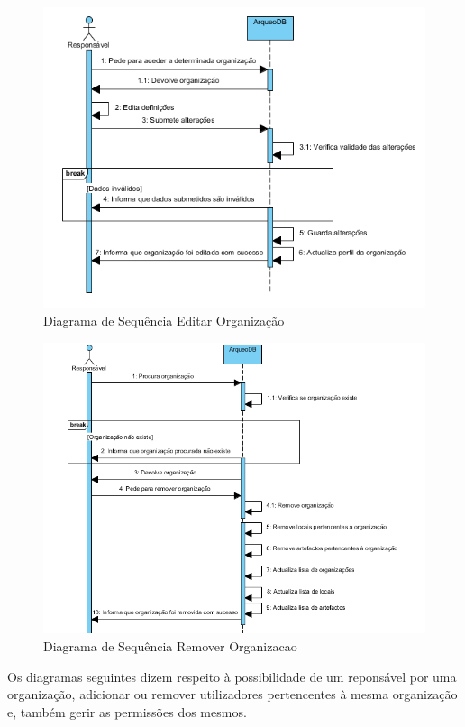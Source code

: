﻿\documentclass[12pt,a4paper]{article}
\begin{document}
\begin{figure}[h!]
\centering
\includegraphics[scale=1]{sequencia/editarorganizacao}
\caption{Diagrama de Sequência Editar Organização} 
\end{figure}  


\begin{figure}[h!]
\centering
\includegraphics[scale=1]{sequencia/removerorganizacao}
\caption{Diagrama de Sequência Remover Organizacao} 
\end{figure}

\clearpage
Os diagramas seguintes dizem respeito à possibilidade de um reponsável por uma organização, adicionar ou remover utilizadores pertencentes à mesma organização e, também gerir as permissões dos mesmos.\\
\end{document}
